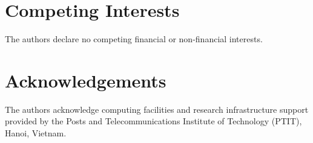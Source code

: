 \documentclass[10pt,twocolumn,letterpaper]{article}
\begin{document}
\section*{Competing Interests}
The authors declare no competing financial or non-financial interests.

\section*{Acknowledgements}
The authors acknowledge computing facilities and research infrastructure support provided by the Posts and Telecommunications Institute of Technology (PTIT), Hanoi, Vietnam.



\end{document}
